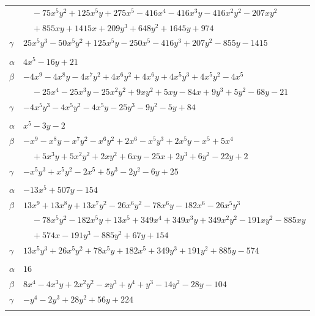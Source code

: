 \documentclass[11pt]{article}
\begin{document}
\begin{longtable}{@{}ll@{}}
 & $\quad -75x^{5}y^{2}+125x^{5}y+275x^{5}-416x^{4}-416x^{3}y-416x^{2}y^{2}-207xy^{2}$\\
 & $\quad +855xy+1415x+209y^{3}+648y^{2}+1645y+974$\\
$\gamma$ & $25x^{5}y^{3}-50x^{5}y^{2}+125x^{5}y-250x^{5}-416y^{3}+207y^{2}-855y-1415$\\
\addlinespace[3pt]
\multicolumn{2}{@{}l}{$\{i,j\}=\{5,26\}$, $k_{ij}=3\cdot 5\cdot 7$}\\
$\alpha$ & $4x^{5}-16y+21$\\
$\beta$ & $-4x^{9}-4x^{8}y-4x^{7}y^{2}+4x^{6}y^{2}+4x^{6}y+4x^{5}y^{3}+4x^{5}y^{2}-4x^{5}$\\
 & $\quad -25x^{4}-25x^{3}y-25x^{2}y^{2}+9xy^{2}+5xy-84x+9y^{3}+5y^{2}-68y-21$\\
$\gamma$ & $-4x^{5}y^{3}-4x^{5}y^{2}-4x^{5}y-25y^{3}-9y^{2}-5y+84$\\
\addlinespace[3pt]
\multicolumn{2}{@{}l}{$\{i,j\}=\{5,32\}$, $k_{ij}=2^{4}\cdot 3$}\\
$\alpha$ & $x^{5}-3y-2$\\
$\beta$ & $-x^{9}-x^{8}y-x^{7}y^{2}-x^{6}y^{2}+2x^{6}-x^{5}y^{3}+2x^{5}y-x^{5}+5x^{4}$\\
 & $\quad +5x^{3}y+5x^{2}y^{2}+2xy^{2}+6xy-25x+2y^{3}+6y^{2}-22y+2$\\
$\gamma$ & $-x^{5}y^{3}+x^{5}y^{2}-2x^{5}+5y^{3}-2y^{2}-6y+25$\\
\addlinespace[3pt]
\multicolumn{2}{@{}l}{$\{i,j\}=\{5,41\}$, $k_{ij}=2^{2}\cdot 3\cdot 5\cdot 7$}\\
$\alpha$ & $-13x^{5}+507y-154$\\
$\beta$ & $13x^{9}+13x^{8}y+13x^{7}y^{2}-26x^{6}y^{2}-78x^{6}y-182x^{6}-26x^{5}y^{3}$\\
 & $\quad -78x^{5}y^{2}-182x^{5}y+13x^{5}+349x^{4}+349x^{3}y+349x^{2}y^{2}-191xy^{2}-885xy$\\
 & $\quad +574x-191y^{3}-885y^{2}+67y+154$\\
$\gamma$ & $13x^{5}y^{3}+26x^{5}y^{2}+78x^{5}y+182x^{5}+349y^{3}+191y^{2}+885y-574$\\
\addlinespace[3pt]
\multicolumn{2}{@{}l}{$\{i,j\}=\{6,8\}$, $k_{ij}=2^{4}\cdot 3\cdot 5$}\\
$\alpha$ & $16$\\
$\beta$ & $8x^{4}-4x^{3}y+2x^{2}y^{2}-xy^{3}+y^{4}+y^{3}-14y^{2}-28y-104$\\
$\gamma$ & $-y^{4}-2y^{3}+28y^{2}+56y+224$\\
\addlinespace[3pt]
\multicolumn{2}{@{}l}{$\{i,j\}=\{6,9\}$, $k_{ij}=2\cdot 13$}\\

\end{longtable}
\end{document}
